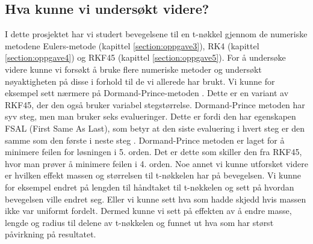 \subsection{Hva kunne vi undersøkt videre?}
I dette prosjektet har vi studert bevegelsene til en t-nøkkel gjennom de numeriske metodene Eulers-metode (kapittel \ref{section:oppgave3}), RK4 (kapittel \ref{section:oppgave4}) og RKF45 (kapittel \ref{section:oppgave5}). For å undersøke videre kunne vi forsøkt å bruke flere numeriske metoder og undersøkt nøyaktigheten på disse i forhold til de vi allerede har brukt.\newline\newline
Vi kunne for eksempel sett nærmere på Dormand-Prince-metoden \cite{DORMAND:1}. Dette er en variant av RKF45, der den også bruker variabel stegstørrelse. Dormand-Prince metoden har syv steg, men man bruker seks evalueringer. Dette er fordi den har egenskapen FSAL (First Same As Last), som betyr at den siste evaluering i hvert steg er den samme som den første i neste steg \cite{DORMAND:1}. Dormand-Prince metoden er laget for å minimere feilen for løsningen i 5. orden. Det er dette som skiller den fra RKF45, hvor man prøver å minimere feilen i 4. orden. \newline\newline
Noe annet vi kunne utforsket videre er hvilken effekt massen og størrelsen til t-nøkkelen har på bevegelsen. Vi kunne for eksempel endret på lengden til håndtaket til t-nøkkelen og sett på hvordan bevegelsen ville endret seg. Eller vi kunne sett hva som hadde skjedd hvis massen ikke var uniformt fordelt. Dermed kunne vi sett på effekten av å endre masse, lengde og radius til delene av t-nøkkelen og funnet ut hva som har størst påvirkning på resultatet.\newline
